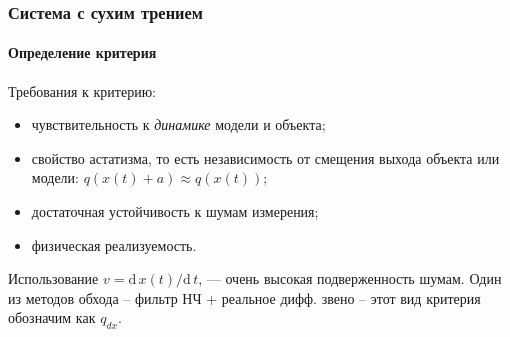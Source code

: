 \documentclass[10pt,utf8]{beamer}
\begin{document}
\begin{frame}
  \frametitle{Система с сухим трением}
  \framesubtitle{Определение критерия}

  Требования к критерию:

  \begin{itemize}

    \item
      чувствительность к \textit{динамике} модели и объекта;

    \item
      свойство астатизма, то есть
      независимость
      от смещения выхода объекта или модели:
      \( q(x(t)+a ) \approx q( x(t) ) \);

    \item
      достаточная устойчивость к шумам измерения;

    \item
      физическая реализуемость.

  \end{itemize}

Использование
\(v = \mathrm{d}\,x(t)/ \mathrm{d}\,t \),
--- очень высокая подверженность шумам.
Один из методов обхода -- фильтр НЧ + реальное дифф. звено --
этот вид критерия обозначим как $ q_{dx} $.

\end{frame}


\end{document}
